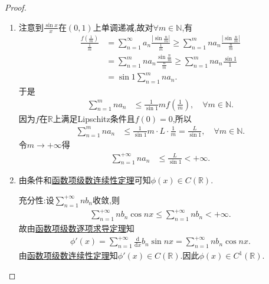 \documentclass[../../main.tex]{subfiles}%
\begin{document}
\begin{proof}
\begin{enumerate}
\item 注意到$\frac{\sin x}{x}$在$\left( 0,1 \right)$上单调递减,故对$\forall m\in \mathbb{N}$,有
\begin{align*}
\frac{f\left( \frac{1}{m} \right)}{\frac{1}{m}}&=\sum_{n=1}^{\infty}{a_n\frac{\left| \sin \frac{n}{m} \right|}{\frac{1}{m}}}\geqslant \sum_{n=1}^m{na_n\frac{\left| \sin \frac{n}{m} \right|}{\frac{n}{m}}}
\\
&=\sum_{n=1}^m{na_n\frac{\sin \frac{n}{m}}{\frac{n}{m}}}\geqslant \sum_{n=1}^m{na_n\frac{\sin 1}{1}}
\\
&=\sin 1\sum_{n=1}^m{na_n.}
\end{align*}
于是
\begin{align*}
\sum_{n=1}^m{na_n}&\leqslant \frac{1}{\sin 1}m f\left( \frac{1}{m} \right),\quad \forall m\in \mathbb{N}.
\end{align*}
因为$f$在$\mathbb{R}$上满足Lipschitz条件且$f\left( 0 \right) =0$,所以
\begin{align*}
\sum_{n=1}^m{na_n}&\leqslant \frac{1}{\sin 1}m \cdot L \cdot \frac{1}{m}=\frac{L}{\sin 1},\quad \forall m\in \mathbb{N}.
\end{align*}
令$m\rightarrow +\infty$得
\begin{align*}
\sum_{n=1}^{+\infty}{na_n}&\leqslant \frac{L}{\sin 1}<+\infty.
\end{align*}

\item 由条件和\hyperref[theorem:函数项级数连续性定理]{函数项级数连续性定理}可知$\phi \left( x \right) \in C\left( \mathbb{R} \right)$.

{\heiti 充分性:}设$\sum_{n=1}^{+\infty}{nb_n}$收敛,则
\begin{align*}
\sum_{n=1}^{+\infty}{nb_n\cos nx}\leqslant \sum_{n=1}^{+\infty}{nb_n}<+\infty.
\end{align*}
故由\hyperref[theorem:函数项级数逐项求导定理]{函数项级数逐项求导定理}知
\begin{align*}
\phi'\left( x \right) =\sum_{n=1}^{+\infty}{\frac{\mathrm{d}}{\mathrm{d}x}b_n\sin nx}=\sum_{n=1}^{+\infty}{nb_n\cos nx}.
\end{align*}
由\hyperref[theorem:函数项级数连续性定理]{函数项级数连续性定理}知$\phi' \left( x \right) \in C\left( \mathbb{R} \right)$.因此$\phi \left( x \right) \in C^1\left( \mathbb{R} \right)$.


\end{enumerate}
\end{proof}
\end{document}
